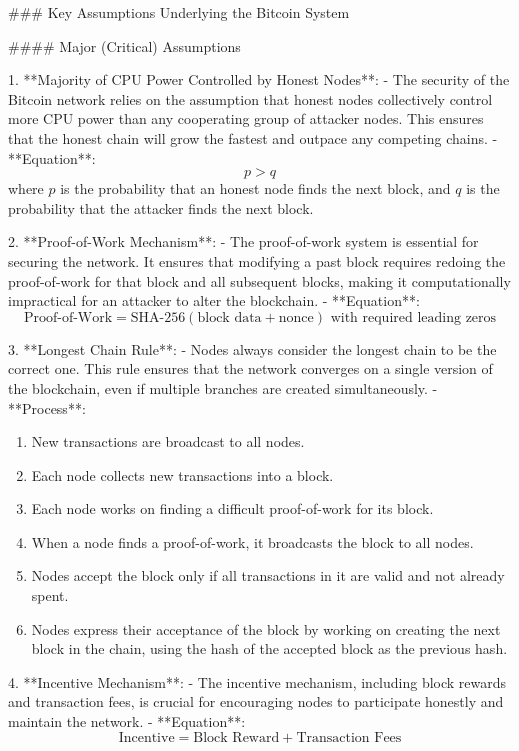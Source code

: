 ### Key Assumptions Underlying the Bitcoin System

#### Major (Critical) Assumptions

1. **Majority of CPU Power Controlled by Honest Nodes**:
   - The security of the Bitcoin network relies on the assumption that honest nodes collectively control more CPU power than any cooperating group of attacker nodes. This ensures that the honest chain will grow the fastest and outpace any competing chains.
   - **Equation**:
     \[
     p > q
     \]
     where \( p \) is the probability that an honest node finds the next block, and \( q \) is the probability that the attacker finds the next block.

2. **Proof-of-Work Mechanism**:
   - The proof-of-work system is essential for securing the network. It ensures that modifying a past block requires redoing the proof-of-work for that block and all subsequent blocks, making it computationally impractical for an attacker to alter the blockchain.
   - **Equation**:
     \[
     \text{Proof-of-Work} = \text{SHA-256}( \text{block data} + \text{nonce} ) \text{ with required leading zeros}
     \]

3. **Longest Chain Rule**:
   - Nodes always consider the longest chain to be the correct one. This rule ensures that the network converges on a single version of the blockchain, even if multiple branches are created simultaneously.
   - **Process**:
     \begin{enumerate}
     \item New transactions are broadcast to all nodes.
     \item Each node collects new transactions into a block.
     \item Each node works on finding a difficult proof-of-work for its block.
     \item When a node finds a proof-of-work, it broadcasts the block to all nodes.
     \item Nodes accept the block only if all transactions in it are valid and not already spent.
     \item Nodes express their acceptance of the block by working on creating the next block in the chain, using the hash of the accepted block as the previous hash.
     \end{enumerate}

4. **Incentive Mechanism**:
   - The incentive mechanism, including block rewards and transaction fees, is crucial for encouraging nodes to participate honestly and maintain the network.
   - **Equation**:
     \[
     \text{Incentive} = \text{Block Reward} + \text{Transaction Fees}
     \]

